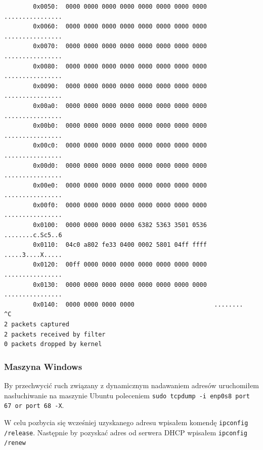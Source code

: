 \documentclass{mwart} %
\begin{document}
\begin{footnotesize}
\begin{verbatim}
        0x0050:  0000 0000 0000 0000 0000 0000 0000 0000  ................
        0x0060:  0000 0000 0000 0000 0000 0000 0000 0000  ................
        0x0070:  0000 0000 0000 0000 0000 0000 0000 0000  ................
        0x0080:  0000 0000 0000 0000 0000 0000 0000 0000  ................
        0x0090:  0000 0000 0000 0000 0000 0000 0000 0000  ................
        0x00a0:  0000 0000 0000 0000 0000 0000 0000 0000  ................
        0x00b0:  0000 0000 0000 0000 0000 0000 0000 0000  ................
        0x00c0:  0000 0000 0000 0000 0000 0000 0000 0000  ................
        0x00d0:  0000 0000 0000 0000 0000 0000 0000 0000  ................
        0x00e0:  0000 0000 0000 0000 0000 0000 0000 0000  ................
        0x00f0:  0000 0000 0000 0000 0000 0000 0000 0000  ................
        0x0100:  0000 0000 0000 0000 6382 5363 3501 0536  ........c.Sc5..6
        0x0110:  04c0 a802 fe33 0400 0002 5801 04ff ffff  .....3....X.....
        0x0120:  00ff 0000 0000 0000 0000 0000 0000 0000  ................
        0x0130:  0000 0000 0000 0000 0000 0000 0000 0000  ................
        0x0140:  0000 0000 0000 0000                      ........
^C 
2 packets captured
2 packets received by filter
0 packets dropped by kernel
\end{verbatim}
\end{footnotesize}

\subsubsection{Maszyna Windows}
By przechwycić ruch związany z dynamicznym nadawaniem adresów uruchomiłem nasłuchiwanie na maszynie Ubuntu poleceniem \texttt{sudo tcpdump -i enp0s8 port 67 or port 68 -X}.

W celu pozbycia się wcześniej uzyskanego adresu wpisałem komendę \texttt{ipconfig /release}.
Następnie by pozyskać adres od serwera DHCP wpisałem \texttt{ipconfig /renew}
\end{document}
